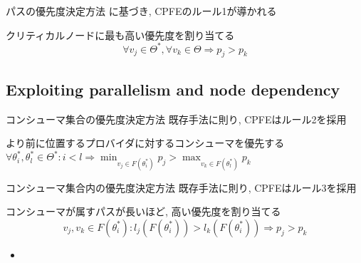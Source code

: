 \begin{frame}{パスの優先度決定方法}
    に基づき, CPFEのルール1が導かれる
    \begin{definition}[ルール1]
        クリティカルノードに最も高い優先度を割り当てる
        \[
            \forall v_{j} \in \Theta^{*}, \forall v_{k} \in \Theta \Rightarrow p_{j}>p_{k}
        \]
    \end{definition}
\end{frame}


\subsection{Exploiting parallelism and node dependency}
\label{ssec: Exploiting parallelism and node dependency}

\begin{frame}{コンシューマ集合の優先度決定方法}
    既存手法\cite{he2019intra}に則り, CPFEはルール2を採用
    \begin{definition}[ルール2]
        より前に位置するプロバイダに対するコンシューマを優先する
        $\forall \theta_{i}^{*}, \theta_{l}^{*} \in \Theta^{*}: i<l \Rightarrow \min _{v_{j} \in F\left(\theta_{i}^{*}\right)} p_{j}>\max _{v_{k} \in F\left(\theta_{l}^{*}\right)} p_{k}$
    \end{definition}
\end{frame}

\begin{frame}{コンシューマ集合内の優先度決定方法}
    既存手法\cite{he2019intra}に則り, CPFEはルール3を採用
    \begin{definition}[ルール3]
        コンシューマが属すパスが長いほど, 高い優先度を割り当てる
        \[
            v_{j}, v_{k} \in F\left(\theta_{i}^{*}\right): l_{j}\left(F\left(\theta_{i}^{*}\right)\right)>l_{k}\left(F\left(\theta_{i}^{*}\right)\right) \Rightarrow p_{j}>p_{k}
        \]
        \vspace{-3mm}
        \begin{itemize}
            \item {}
        \end{itemize}
    \end{definition}
\end{frame}


